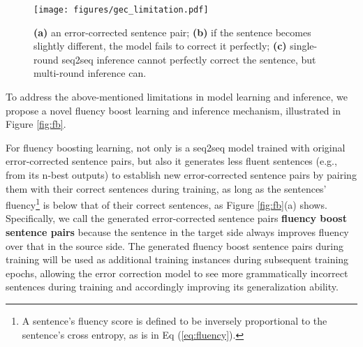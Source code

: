 \documentclass{article} \usepackage{MSRA_TR,times}
\begin{document}
\begin{figure}[h]
\centering
\texttt{[image: figures/gec\_limitation.pdf]}\vspace{-0.2cm}
\caption{\textbf{(a)} an error-corrected sentence pair; \textbf{(b)} if the sentence becomes slightly different, the model fails to correct it perfectly; \textbf{(c)} single-round seq2seq inference cannot perfectly correct the sentence, but multi-round inference can.}\label{fig:limitations}\vspace{-0.1cm}
\end{figure}



To address the above-mentioned limitations in model learning and inference, we propose a novel fluency boost learning and inference mechanism, illustrated in Figure \ref{fig:fb}.


For fluency boosting learning, not only is a seq2seq model trained with original error-corrected sentence pairs, but also it generates less fluent sentences (e.g., from its n-best outputs) to establish new error-corrected sentence pairs by pairing them with their correct sentences during training, as long as the sentences' fluency\footnote{A sentence's fluency score is defined to be inversely proportional to the sentence's cross entropy, as is in Eq (\ref{eq:fluency}).} is below that of their correct sentences, as Figure \ref{fig:fb}(a) shows. Specifically, we call the generated error-corrected sentence pairs \textbf{fluency boost sentence pairs} because the sentence in the target side always improves fluency over that in the source side. The generated fluency boost sentence pairs during training will be used as additional training instances during subsequent training epochs, allowing the error correction model to see more grammatically incorrect sentences during training and accordingly improving its generalization ability. 
\end{document}
